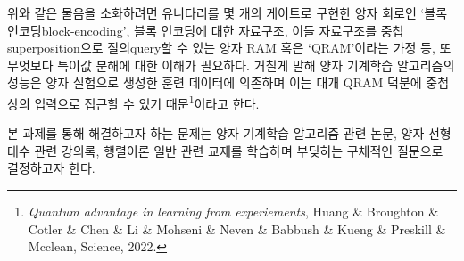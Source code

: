 \documentclass[a4paper,hidelinks]{oblivoir}
\begin{document}
위와 같은 물음을 소화하려면 유니타리를 몇 개의 게이트로 구현한 양자 회로인 
`블록 인코딩{\footnotesize block-encoding}', 블록 인코딩에 대한 자료구조, 이들
자료구조를 중첩{\tiny superposition}으로 질의{\tiny query}할 수 있는 양자 RAM
혹은 `QRAM'이라는 가정 등, 또 무엇보다 특이값 분해에 대한 이해가 필요하다.
거칠게 말해 양자 기계학습 알고리즘의 성능은 양자 실험으로 생성한 훈련 데이터에
의존하며 이는 대개 QRAM 덕분에 중첩상의 입력으로 접근할 수 있기 
때문\footnote{\emph{Quantum advantage in learning from experiements}, Huang \&
Broughton \& Cotler \& Chen \& Li \& Mohseni \& Neven \& Babbush \& Kueng \&
Preskill \& Mcclean, Science, 2022.}이라고 한다.

본 과제를 통해 해결하고자 하는 문제는 양자 기계학습 알고리즘 관련 논문,
양자 선형대수 관련 강의록, 행렬이론 일반 관련 교재를 학습하며 부딪히는
구체적인 질문으로 결정하고자 한다.
\end{document}
